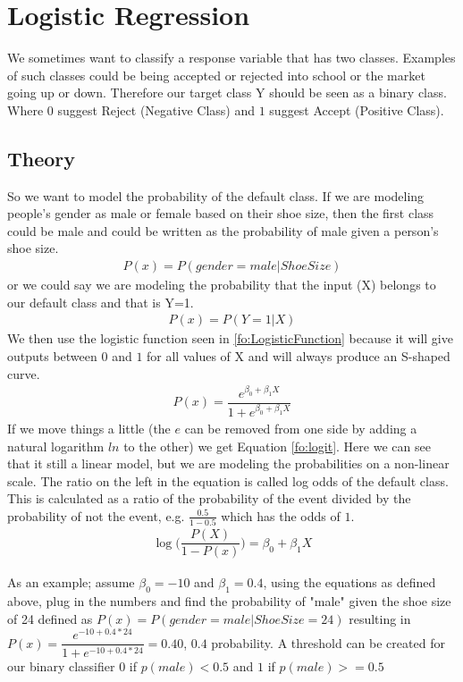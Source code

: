\section{Logistic Regression}\label{sc:logisticRegression}
We sometimes want to classify a response variable that has two classes. Examples of such classes could be being accepted or rejected into school or the market going up or down. Therefore our target class Y should be seen as a binary class. Where $0$ suggest Reject (Negative Class) and $1$ suggest Accept (Positive Class).
\subsection{Theory}
So we want to model the probability of the default class. If we are modeling people’s gender as male or female based on their shoe size, then the first class could be male and could be written as the probability of male given a person’s shoe size.
\begin{align}
P(x) = P(gender=male|ShoeSize)
\end{align}
or we could say we are modeling the probability that the input (X) belongs to our default class and that is Y=1.
\begin{align}\label{fo:probability}
P(x) = P(Y=1|X)
\end{align}
We then use the logistic function seen in \ref{fo:LogisticFunction} because it will give outputs between $0$ and $1$ for all values of X and will always produce an S-shaped curve.%
\begin{align}\label{fo:LogisticFunction}
P(x) = \dfrac{ e^{\beta_0 + \beta_1 X}}{  1 + e^{\beta_0 + \beta_1 X}}
\end{align}
If we move things a little (the $e$ can be removed from one side by adding a natural logarithm $ln$ to the other) we get Equation \ref{fo:logit}. Here we can see that it still a linear model, but we are modeling the probabilities on a non-linear scale. The ratio on the left in the equation is called log odds of the default class. This is calculated as a ratio of the probability of the event divided by the probability of not the event, e.g. $\frac{0.5}{1-0.5}$ which has the odds of $1$.
 \begin{align}\label{fo:logit}
\log\bigg( \dfrac{ P(X)}{1-P(x)} \bigg) = \beta_0 + \beta_1 X
\end{align}

As an example; assume $\beta_0 = -10 $ and $ \beta_1 = 0.4 $, using the equations as defined above, plug in the numbers and find the probability of "male" given the shoe size of 24 defined as $P(x) = P(gender=male|ShoeSize=24)$ resulting in $P(x) = \dfrac{ e^{-10 + 0.4*24}}{1 + e^{-10 + 0.4*24}} = 0.40$, $0.4$ probability. A threshold can be created for our binary classifier $0$ if $p(male) < 0.5$ and $1$ if $ p(male) >= 0.5$

